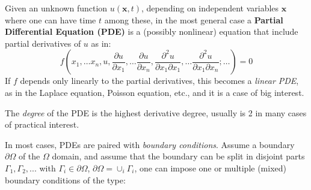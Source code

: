 \documentclass{digitaldynamics}
\def\vect#1{\bm{#1}}
\begin{document}
Given an unknown function $u(\vect{x},t)$, depending on independent variables $\vect{x}$ where one can have time $t$ among these, in the most 
general case a \textbf{Partial Differential Equation (PDE)} is a (possibly nonlinear)
equation that include partial derivatives of $u$ as in:
\[
f \left (x_1, \ldots x_n, u, \frac{\partial u}{\partial x_1}, \ldots \frac{\partial u}{\partial x_n}, \frac{\partial^2 u}{\partial x_1 \partial x_1}, \ldots \frac{\partial^2 u}{\partial x_1 \partial x_n}; \ldots \right) = 0 
\]
If $f$ depends only linearly to the partial derivatives, this becomes a \textit{linear PDE}, as in the Laplace equation, Poisson equation, etc., and it is a case of big interest. 

The \textit{degree} of the PDE is the highest derivative degree, usually is 2 in many cases of practical interest.

In most cases, PDEs are paired with \textit{boundary conditions}. Assume a boundary $\partial \Omega$ of the $\Omega$ domain, and assume that the boundary can be split in disjoint parts $\Gamma_1, \Gamma_2, ...$ with $\Gamma_i \in \partial\Omega$, $\partial\Omega = \cup_i \Gamma_i$, one can impose one or multiple (mixed) boundary conditions of the type:
\end{document}
